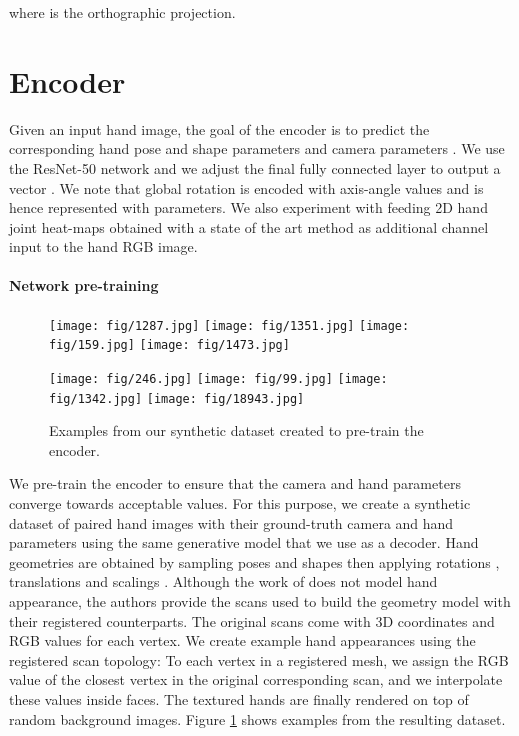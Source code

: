 \documentclass[10pt,twocolumn,letterpaper]{article}
\begin{document}
where  is the orthographic projection.

\section{Encoder}
\label{sec:encoder}

Given an input hand image, the goal of the encoder is to predict the corresponding hand pose and shape parameters  and camera parameters . We use the ResNet-50 network \cite{he2016identity} and we adjust the final fully connected layer to output a vector . We note that global rotation  is encoded with axis-angle values and is hence represented with  parameters. We also experiment with feeding 2D hand joint heat-maps obtained with a state of the art method \cite{simon2017hand} as additional channel input to the hand RGB image.
        
\paragraph{Network pre-training} 
\vspace{-10pt}
\begin{figure}[h]
\center
\texttt{[image: fig/1287.jpg]}
\texttt{[image: fig/1351.jpg]}
\texttt{[image: fig/159.jpg]}
\texttt{[image: fig/1473.jpg]}
\par\addvspace{2pt}
\texttt{[image: fig/246.jpg]}
\texttt{[image: fig/99.jpg]}
\texttt{[image: fig/1342.jpg]}
\texttt{[image: fig/18943.jpg]}
\caption{Examples from our synthetic dataset created to pre-train the encoder.}
\label{fig:pretrain}
\end{figure}

We pre-train the encoder to ensure that the camera and hand parameters converge towards acceptable values. For this purpose, we create a synthetic dataset of paired hand images with their ground-truth camera and hand parameters using the same generative model that we use as a decoder. Hand geometries are obtained by sampling poses  and shapes  then applying rotations , translations  and scalings . Although the work of  \cite{romero2017embodied} does not model hand appearance, the authors provide the scans used to build the geometry model with their registered counterparts. The original scans come with 3D coordinates and RGB values for each vertex. We create example hand appearances using the registered scan topology: To each vertex in a registered mesh, we assign the RGB value of the closest vertex in the original corresponding scan, and we interpolate these values inside faces. The textured hands are finally rendered on top of random background images. Figure \ref{fig:pretrain} shows examples from the resulting dataset.  
\end{document}
